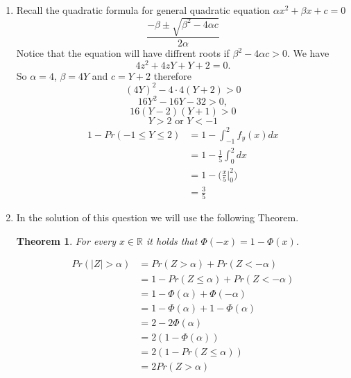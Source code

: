 \documentclass[a4paper, 11pt, oneside]{article}
\newtheorem{theorem}{Theorem}[section]
\newcommand{\R}{\mathbb{R}}
\newcommand\abs[1]{\left|#1\right|}
\begin{document}
\begin{enumerate}
\begin{enumerate}
\item  
Recall the quadratic formula for general quadratic equation $\alpha x^2 + \beta x + c = 0$
\begin{equation*}
\frac{-\beta \pm \sqrt{\beta^2 - 4\alpha c}}{2\alpha}
\end{equation*}
Notice that the equation will have diffrent roots if $\beta^2 - 4\alpha c > 0$. We have 
\begin{equation*}
4z^2 + 4zY + Y + 2 = 0.
\end{equation*}
 So $\alpha = 4$, $\beta = 4Y$ and $c = Y + 2$ therefore
 \begin{equation*}
 (4Y)^2 - 4 \cdot 4(Y + 2) > 0
\end{equation*}
 \begin{equation*}
 16Y^2 - 16 Y - 32 > 0,
\end{equation*}
 \begin{equation*}
 16(Y - 2)(Y + 1) > 0
\end{equation*}
 \begin{equation*}
Y > 2 \text{ or } Y < -1
\end{equation*}
 \begin{align*}
1 - Pr(-1\leq Y\leq 2) &=
1 - \int^2_{-1}f_y(x)dx \\&=
 1 - \frac{1}{5} \int^2_{0}dx \\&=
1 - \Big(\frac{x}{5}\Bigr|^2_0\Big) \\&= \frac{3}{5}
 \end{align*}
\item  
In the solution of this question we will use the following Theorem.
\begin{theorem} 
For every $x \in \R$ it holds that $\Phi(-x) = 1 - \Phi(x)$.
\end{theorem} 
 \begin{align*}
Pr(\abs{Z}>\alpha) &=
Pr(Z>\alpha) + Pr(Z<-\alpha) \\&=
1 - Pr(Z \leq \alpha) + Pr(Z<-\alpha) \\&=
1 - \Phi(\alpha) + \Phi(-\alpha) \\&=
1 - \Phi(\alpha) + 1 - \Phi(\alpha) \\&=
2 - 2\Phi(\alpha)  \\&=
2(1 -\Phi(\alpha))\\&=
2(1 - Pr(Z\leq\alpha)) \\&=
 2Pr(Z>\alpha)
 \end{align*}
 \end{enumerate}
 
\end{enumerate}

\begin{thebibliography}{9} 

\end{thebibliography}
\end{document}

